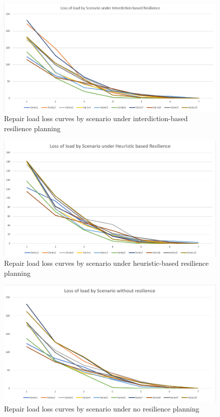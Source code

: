 \documentclass{article}
\begin{document}
\begin{figure}[htbp]
	\centering
	\includegraphics[width=.9\linewidth]{OptimalResilienceSpaghetti.png}
	\caption{Repair load loss curves by scenario under interdiction-based resilience planning}
\end{figure}
	\begin{figure}[htbp]
		\centering
		\includegraphics[width=.9\linewidth]{HeuristicResilienceSpaghetti.png}
		\caption{Repair load loss curves by scenario under heuristic-based resilience planning}
	\end{figure}
\begin{figure}[htbp]
	\centering
	\includegraphics[width=.9\linewidth]{NoResilienceSpaghetti.png}
	\caption{Repair load loss curves by scenario under no resilience planning}
\end{figure}
\end{document}
